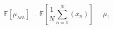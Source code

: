 \begin{equation}
\label{eq:mu}
\mathbb{E}[\mu_{ML}] = \mathbb{E}\left[\frac{1}{N} \sum_{n =
1}^{N}{(x_n)}\right] = \mu ,
\end{equation}